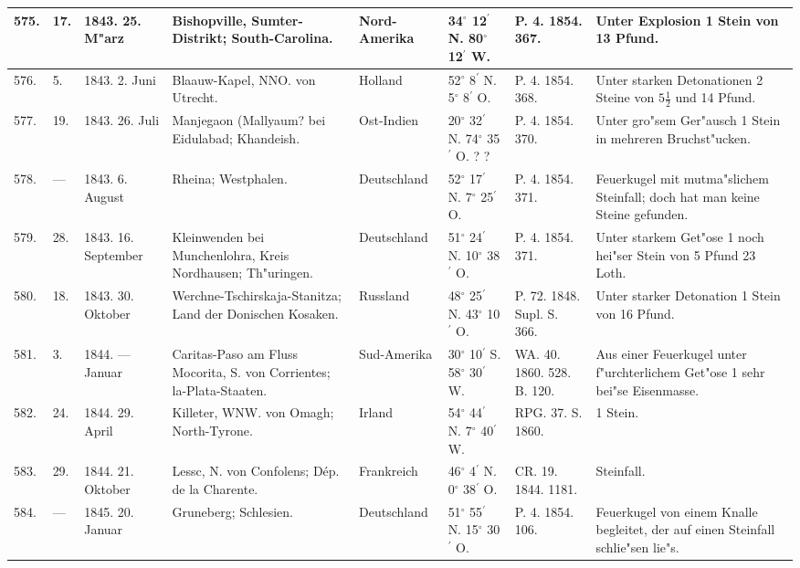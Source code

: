 \documentclass[a4paper, 8pt, oneside, polutonikogreek, german]{article}
\begin{document}
\begin{center}
\begin{longtable}{| p{5mm} | p{3mm} | p{15mm} | p{25mm} | p{20mm} | p{14mm} | p{17mm} | p{24mm} |}
        575. & 17. & 1843. 25. M"arz & Bishopville, Sumter-Distrikt; South-Carolina. & Nord-Amerika & 34$^\circ$ 12$^\prime$ N. 80$^\circ$ 12$^\prime$ W. & P. 4. 1854. 367. & Unter Explosion 1 Stein von 13 Pfund. \\ \hline
        576. & 5. & 1843. 2. Juni & Blaauw-Kapel, NNO. von Utrecht. & Holland & 52$^\circ$ 8$^\prime$ N. 5$^\circ$ 8$^\prime$ O. & P. 4. 1854. 368. & Unter starken Detonationen 2 Steine von $5\frac{1}{2}$ und 14 Pfund. \\ \hline
        577. & 19. & 1843. 26. Juli & Manjegaon (Mallyaum? bei Eidulabad; Khandeish. & Ost-Indien & 20$^\circ$ 32$^\prime$ N. 74$^\circ$ 35$^\prime$ O. ? ? & P. 4. 1854. 370. & Unter gro"sem Ger"ausch 1 Stein in mehreren Bruchst"ucken. \\ \hline
        578. & --- & 1843. 6. August & Rheina; Westphalen. & Deutschland & 52$^\circ$ 17$^\prime$ N. 7$^\circ$ 25$^\prime$ O. & P. 4. 1854. 371. & Feuerkugel mit mutma"slichem Steinfall; doch hat man keine Steine gefunden. \\ \hline
        579. & 28. & 1843. 16. September & Kleinwenden bei Munchenlohra, Kreis Nordhausen; Th"uringen. & Deutschland & 51$^\circ$ 24$^\prime$ N. 10$^\circ$ 38$^\prime$ O. & P. 4. 1854. 371. & Unter starkem Get"ose 1 noch hei"ser Stein von 5 Pfund 23 Loth. \\ \hline
        580. & 18. & 1843. 30. Oktober & Werchne-Tschirskaja-Stanitza; Land der Donischen Kosaken. & Russland & 48$^\circ$ 25$^\prime$ N. 43$^\circ$ 10$^\prime$ O. & P. 72. 1848. Supl. S. 366. & Unter starker Detonation 1 Stein von 16 Pfund. \\ \hline
        581. & 3. & 1844. --- Januar & Caritas-Paso am Fluss Mocorita, S. von Corrientes; la-Plata-Staaten. & Sud-Amerika & 30$^\circ$ 10$^\prime$ S. 58$^\circ$ 30$^\prime$ W. & WA. 40. 1860. 528. B. 120. & Aus einer Feuerkugel unter f"urchterlichem Get"ose 1 sehr bei"se Eisenmasse. \\ \hline
        582. & 24. & 1844. 29. April & Killeter, WNW. von Omagh; North-Tyrone. & Irland & 54$^\circ$ 44$^\prime$ N. 7$^\circ$ 40$^\prime$ W. & RPG. 37. S. 1860. & 1 Stein. \\ \hline
        583. & 29. & 1844. 21. Oktober & Lessc, N. von Confolens; Dép. de la Charente. & Frankreich & 46$^\circ$ 4$^\prime$ N. 0$^\circ$ 38$^\prime$ O. & CR. 19. 1844. 1181. & Steinfall. \\ \hline
        584. & --- & 1845. 20. Januar & Gruneberg; Schlesien. & Deutschland & 51$^\circ$ 55$^\prime$ N. 15$^\circ$ 30$^\prime$ O. & P. 4. 1854. 106. & Feuerkugel von einem Knalle begleitet, der auf einen Steinfall schlie"sen lie"s. \\ \hline

\end{longtable}
\end{center}
\end{document}
